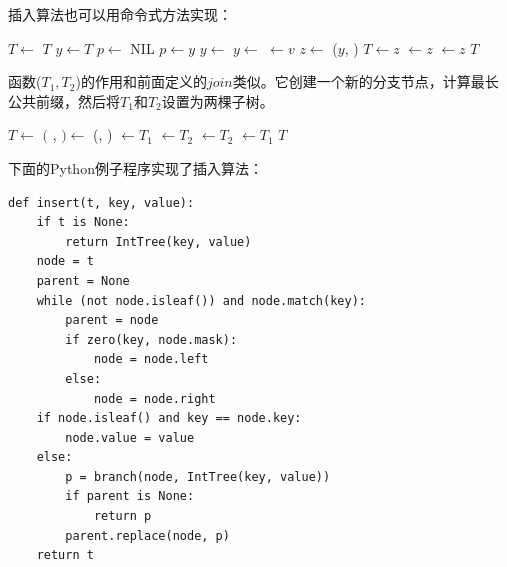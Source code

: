 \documentclass[b5paper]{ctexart}
\begin{document}
插入算法也可以用命令式方法实现：

\begin{algorithmic}[1]
    \State $T \gets$ 
    \State \Return $T$
  \EndIf
  \State $y \gets T$
  \State $p \gets$ NIL
    \State $p \gets y$
      \State $y \gets$ 
    \Else
      \State $y \gets$ 
    \EndIf
  \EndWhile
    \State {} $\gets v$
  \Else
    \State $z \gets$ ($y$, )
      \State $T \gets z$
    \Else
        \State {} $\gets z$
      \Else
        \State {} $\gets z$
      \EndIf
    \EndIf
  \EndIf
  \State \Return $T$
\EndFunction
\end{algorithmic}

函数($T_1, T_2$)的作用和前面定义的$join$类似。它创建一个新的分支节点，计算最长公共前缀，然后将$T_1$和$T_2$设置为两棵子树。

\begin{algorithmic}[1]
  \State $T \gets$ 
  \State $($ ,  $) \gets$ (, )
    \State {} $\gets T_1$
    \State {} $\gets T_2$
  \Else
    \State {} $\gets T_2$
    \State {} $\gets T_1$
  \EndIf
  \State \Return $T$
\EndFunction
\end{algorithmic}

下面的Python例子程序实现了插入算法：

\lstset{language=Python}
\begin{lstlisting}
def insert(t, key, value):
    if t is None:
        return IntTree(key, value)
    node = t
    parent = None
    while (not node.isleaf()) and node.match(key):
        parent = node
        if zero(key, node.mask):
            node = node.left
        else:
            node = node.right
    if node.isleaf() and key == node.key:
        node.value = value
    else:
        p = branch(node, IntTree(key, value))
        if parent is None:
            return p
        parent.replace(node, p)
    return t
\end{lstlisting}
\end{document}
